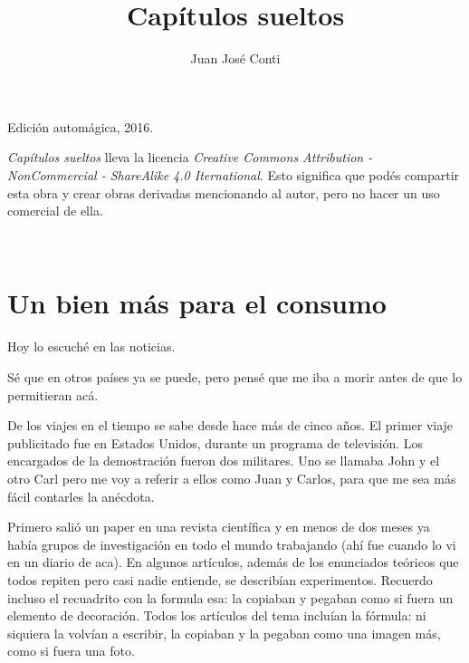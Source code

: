 \documentclass[12pt,twoside,openright]{book}
\title{Capítulos sueltos}
\author{Juan José Conti}
\date{}
\begin{document}

\pagestyle{plain}


%
%

\maketitle

\cleardoublepage

\thispagestyle{empty}
\noindent
Edición automágica, 2016.\\

\vspace{0.5cm}

\noindent
\emph{Capítulos sueltos} lleva la licencia
\emph{Creative Commons Attribution - NonCommercial - ShareAlike 4.0 Iternational}.
Esto significa que podés compartir esta obra y crear obras derivadas
mencionando al autor, pero no ha\-cer un uso comercial de ella.

\vfill

\noindent
\\

\cleardoublepage


\renewcommand*\contentsname{Índice}

\tableofcontents


\cleardoublepage






\chapter*{Un bien más para el consumo} 



Hoy lo escuché en las noticias.

Sé que en otros países ya se puede, pero pensé que me iba a morir antes de que lo permitieran acá.

De los viajes en el tiempo se sabe desde hace más de cinco años. El primer viaje publicitado fue en Estados Unidos, durante un programa de televisión. Los encargados de la demostración fueron dos militares. Uno se llamaba John y el otro Carl pero me voy a referir a ellos como Juan y Carlos, para que me sea más fácil contarles la anécdota.

Primero salió un paper en una revista científica y en menos de dos meses ya había grupos de investigación en todo el mundo trabajando (ahí fue cuando lo vi en un diario de aca). En algunos artículos, además de los enunciados teóricos que todos repiten pero casi nadie entiende, se describían experimentos. Recuerdo incluso el recuadrito con la formula esa: la copiaban y pegaban como si fuera un elemento de decoración. Todos los artículos del tema incluían la fórmula: ni siquiera la volvían a escribir, la copiaban y la pegaban como una imagen más, como si fuera una foto.
\end{document}
